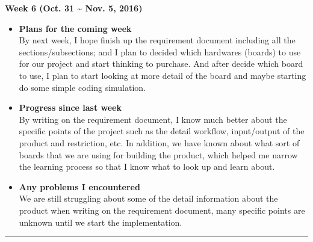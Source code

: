		\begin{center}
			\textbf{Week 6 (Oct. 31 {\textasciitilde{}} Nov. 5, 2016)}
		\end{center}
		\begin{itemize}
			\item \textbf{Plans for the coming week}
			\\By next week, I hope finish up the requirement document including all the sections/subsections; and I plan to decided which hardwares (boards) to use for our project and start thinking to purchase. And after decide which board to use, I plan to start looking at more detail of the board and maybe starting do some simple coding simulation.\\

			\item \textbf{Progress since last week}
			\\By writing on the requirement document, I know much better about the specific points of the project such as the detail workflow, input/output of the product and restriction, etc. In addition, we have known about what sort of boards that we are using for building the product, which helped me narrow the learning process so that I know what to look up and learn about.\\

			\item \textbf{Any problems I encountered}
			\\We are still struggling about some of the detail information about the product when writing on the requirement document, many specific points are unknown until we start the implementation.\\
		\end{itemize}

		\rule{\textwidth}{0.5pt}

